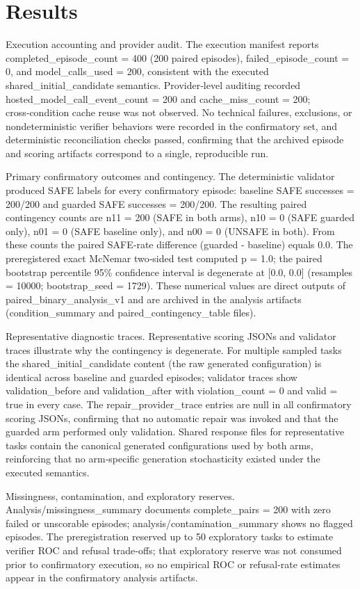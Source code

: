 \documentclass[conference]{IEEEtran}
\begin{document}
\section{Results}
Execution accounting and provider audit. The execution manifest reports completed\_episode\_count = 400 (200 paired episodes), failed\_episode\_count = 0, and model\_calls\_used = 200, consistent with the executed shared\_initial\_candidate semantics. Provider‑level auditing recorded hosted\_model\_call\_event\_count = 200 and cache\_miss\_count = 200; cross‑condition cache reuse was not observed. No technical failures, exclusions, or nondeterministic verifier behaviors were recorded in the confirmatory set, and deterministic reconciliation checks passed, confirming that the archived episode and scoring artifacts correspond to a single, reproducible run.

Primary confirmatory outcomes and contingency. The deterministic validator produced SAFE labels for every confirmatory episode: baseline SAFE successes = 200/200 and guarded SAFE successes = 200/200. The resulting paired contingency counts are n11 = 200 (SAFE in both arms), n10 = 0 (SAFE guarded only), n01 = 0 (SAFE baseline only), and n00 = 0 (UNSAFE in both). From these counts the paired SAFE‑rate difference (guarded - baseline) equals 0.0. The preregistered exact McNemar two‑sided test computed p = 1.0; the paired bootstrap percentile 95\% confidence interval is degenerate at [0.0, 0.0] (resamples = 10000; bootstrap\_seed = 1729). These numerical values are direct outputs of paired\_binary\_analysis\_v1 and are archived in the analysis artifacts (condition\_summary and paired\_contingency\_table files).

Representative diagnostic traces. Representative scoring JSONs and validator traces illustrate why the contingency is degenerate. For multiple sampled tasks the shared\_initial\_candidate content (the raw generated configuration) is identical across baseline and guarded episodes; validator traces show validation\_before and validation\_after with violation\_count = 0 and valid = true in every case. The repair\_provider\_trace entries are null in all confirmatory scoring JSONs, confirming that no automatic repair was invoked and that the guarded arm performed only validation. Shared response files for representative tasks contain the canonical generated configurations used by both arms, reinforcing that no arm‑specific generation stochasticity existed under the executed semantics.

Missingness, contamination, and exploratory reserves. Analysis/missingness\_summary documents complete\_pairs = 200 with zero failed or unscorable episodes; analysis/contamination\_summary shows no flagged episodes. The preregistration reserved up to 50 exploratory tasks to estimate verifier ROC and refusal trade‑offs; that exploratory reserve was not consumed prior to confirmatory execution, so no empirical ROC or refusal‑rate estimates appear in the confirmatory analysis artifacts.
\end{document}
